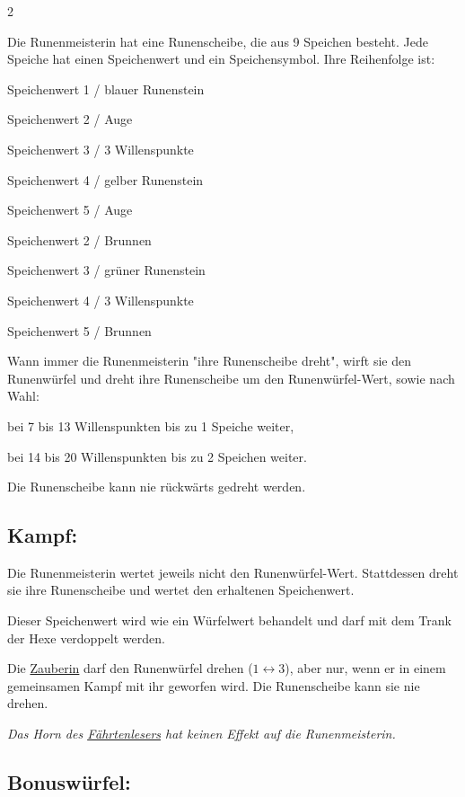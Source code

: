 \documentclass[10pt, a4paper, oneside]{book}
\newcommand{\fan}[1]{\textit{#1}}
\begin{document}
\begin{multicols*}{2}
\begin{nobgcolor}
Die Runenmeisterin hat eine Runenscheibe, die aus 9 Speichen besteht. Jede Speiche hat einen Speichenwert und ein Speichensymbol. Ihre Reihenfolge ist:

\bullet{} Speichenwert 1 / blauer Runenstein

\bullet{} Speichenwert 2 / Auge

\bullet{} Speichenwert 3 / 3 Willenspunkte

\bullet{} Speichenwert 4 / gelber Runenstein

\bullet{} Speichenwert 5 / Auge

\bullet{} Speichenwert 2 / Brunnen

\bullet{} Speichenwert 3 / grüner Runenstein

\bullet{} Speichenwert 4 / 3 Willenspunkte

\bullet{} Speichenwert 5 / Brunnen

Wann immer die Runenmeisterin "ihre Runenscheibe dreht", wirft sie den Runenwürfel und dreht ihre Runenscheibe um den Runenwürfel-Wert, sowie nach Wahl:

\bullet{} bei 7 bis 13 Willenspunkten bis zu\supercite{89598} 1 Speiche weiter,

\bullet{} bei 14 bis 20 Willenspunkten bis zu\supercite{89598} 2 Speichen weiter.

Die Runenscheibe kann nie rückwärts gedreht werden.
\supercite{MH:Begleitheft}




\subsection{Kampf:}

Die Runenmeisterin wertet jeweils nicht den Runenwürfel-Wert. Stattdessen dreht sie ihre Runenscheibe und wertet den erhaltenen Speichenwert.

Dieser Speichenwert wird wie ein Würfelwert behandelt und darf mit dem Trank der Hexe verdoppelt werden.
\supercite{90045}

Die \hyperref[Zauberin]{Zauberin} darf den Runenwürfel drehen\supercite{88563} ($1 \leftrightarrow 3$), aber nur, wenn er in einem gemeinsamen Kampf mit ihr geworfen wird. Die Runenscheibe kann sie nie drehen.

\fan{Das Horn des \hyperref[Fährtenleser]{Fährtenlesers} hat keinen Effekt auf die Runenmeisterin.}



\subsection{Bonuswürfel:}


\end{nobgcolor}
\end{multicols*}
\end{document}
